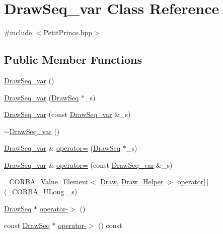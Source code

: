 \hypertarget{class_draw_seq__var}{}\section{Draw\+Seq\+\_\+var Class Reference}
\label{class_draw_seq__var}


{\ttfamily \#include $<$Petit\+Prince.\+hpp$>$}

\subsection*{Public Member Functions}
\begin{DoxyCompactItemize}
\item 
\hyperlink{class_draw_seq__var_a4518ea24553a2aafd836c006c26a9fff}{Draw\+Seq\+\_\+var} ()
\item 
\hyperlink{class_draw_seq__var_aeebfb914d20643d8702d68316d5e0d7d}{Draw\+Seq\+\_\+var} (\hyperlink{class_draw_seq}{Draw\+Seq} $\ast$\+\_\+s)
\item 
\hyperlink{class_draw_seq__var_a0292cb4e4593865dde71c1935c91f23e}{Draw\+Seq\+\_\+var} (const \hyperlink{class_draw_seq__var}{Draw\+Seq\+\_\+var} \&\+\_\+s)
\item 
\hyperlink{class_draw_seq__var_ad50acfa35f8eb735d8ec4ae89036df7a}{$\sim$\+Draw\+Seq\+\_\+var} ()
\item 
\hyperlink{class_draw_seq__var}{Draw\+Seq\+\_\+var} \& \hyperlink{class_draw_seq__var_ae2163957cae0c0c7ad29fc8f0d1c2e73}{operator=} (\hyperlink{class_draw_seq}{Draw\+Seq} $\ast$\+\_\+s)
\item 
\hyperlink{class_draw_seq__var}{Draw\+Seq\+\_\+var} \& \hyperlink{class_draw_seq__var_a7552db5e6ff6519dbba182d5166fc74c}{operator=} (const \hyperlink{class_draw_seq__var}{Draw\+Seq\+\_\+var} \&\+\_\+s)
\item 
\+\_\+\+C\+O\+R\+B\+A\+\_\+\+Value\+\_\+\+Element$<$ \hyperlink{class_draw}{Draw}, \hyperlink{class_draw___helper}{Draw\+\_\+\+Helper} $>$ \hyperlink{class_draw_seq__var_a75adf5f5bc9cf4bb1027c7cbcc53005e}{operator\mbox{[}$\,$\mbox{]}} (\+\_\+\+C\+O\+R\+B\+A\+\_\+\+U\+Long \+\_\+s)
\item 
\hyperlink{class_draw_seq}{Draw\+Seq} $\ast$ \hyperlink{class_draw_seq__var_a8d10efff3b1c9a5a0ca4bc94a024d430}{operator-\/$>$} ()
\item 
const \hyperlink{class_draw_seq}{Draw\+Seq} $\ast$ \hyperlink{class_draw_seq__var_ac4fb1a0e5aa99f10f07c58c5e1d66548}{operator-\/$>$} () const 
\item 

\end{DoxyCompactItemize}

